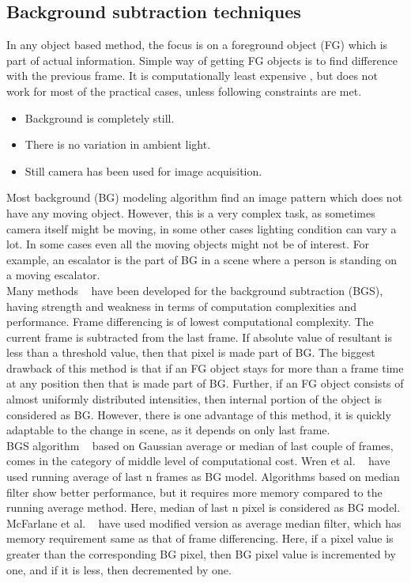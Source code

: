 \subsection{Background subtraction techniques}
\label{bg_subs_technique}
\indent In any object based method, the focus is on a foreground object
(FG) which is part of actual information. Simple way of getting FG
objects is to find difference with the previous frame. It is
computationally least expensive , but does not work for most of the
practical cases, unless following constraints are met.
\begin{itemize}
	\item Background is completely still.
	\item There is no variation in ambient light.
	\item Still camera has been used for image acquisition.
\end{itemize}
Most background (BG) modeling algorithm find an image pattern which does
not have any moving object. However, this is a very complex task, as
sometimes camera itself might be moving, in some other cases lighting
condition can vary a lot. In some cases even all the moving objects
might not be of interest. For example, an escalator is the part of BG in
a scene where a person is standing on a moving escalator.\\

\indent Many methods ~\cite{9, 10, 11, 12, 13, 14} have been developed
for the background subtraction (BGS), having strength and weakness in
terms of computation complexities and performance. Frame differencing is
of lowest computational complexity. The current frame is subtracted from
the last frame. If absolute value of resultant is less than a threshold
value, then that pixel is made part of BG.  The biggest drawback of this
method is that if an FG object stays for more than a frame time at any
position then that is made part of BG. Further, if an FG object consists
of almost uniformly distributed intensities, then internal portion of
the object is considered as BG. However, there is one advantage of this
method, it is quickly adaptable to the change in scene, as it depends on
only last frame.\\

\indent BGS algorithm ~\cite{10, 12, 13, 14, 15} based on Gaussian
average or median of last couple of frames, comes in the category of
middle level of computational cost. Wren et al. ~\cite{12} have used
running average of last n frames as BG model. Algorithms based on median
filter show better performance, but it requires more memory compared to
the running average method. Here, median of last n pixel is considered
as BG model.  McFarlane et al. ~\cite{14} have used modified version as
average median filter, which has memory requirement same as that of
frame differencing.  Here, if a pixel value is greater than the
corresponding BG pixel, then BG pixel value is incremented by one, and
if it is less, then decremented by one.\\

